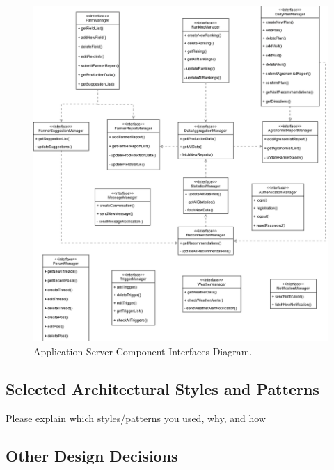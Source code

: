 \begin{figure}[hbt!]
\centering
\includegraphics[width=\textwidth]{../images_diagrams/dd/component_interfaces_diagram.png}
\caption{Application Server Component Interfaces Diagram.}
\label{fig:componentInterface}
\end{figure}

\subsection{Selected Architectural Styles and Patterns}
Please explain which styles/patterns you used, why, and how
\subsection{Other Design Decisions}